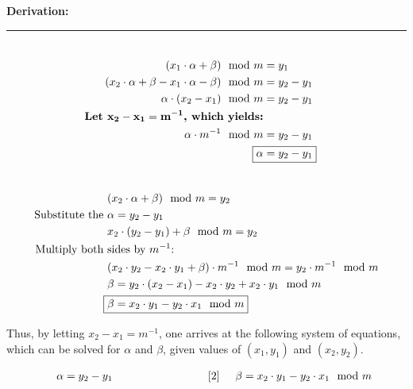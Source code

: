 \documentclass{article}
\begin{document}
\noindent \textbf{Derivation:}
\hrule
\vspace{-.5cm}
\begin{minipage}{.4\textwidth} %
 \begin{align*}
 \\
(x_1 \cdot \alpha + \beta) \mod m &= y_1 \\
(x_2 \cdot \alpha + \beta - x_1 \cdot \alpha - \beta) \mod m &= y_2 - y_1 \\
 \alpha \cdot (x_2 - x_1) \mod m &= y_2 - y_1 \\
\text{\textbf{Let $\mathbf{x_2-x_1 = m^{-1}}$, which yields:}}\\
  \alpha \cdot m^{-1} \mod m &= y_2 - y_1 \\
  \Aboxed{\alpha &= y_2 - y_1}
  \\
  \\
\end{align*}
\end{minipage} %
\hspace{.25cm}
\begin{minipage}{.5\textwidth}
\begin{align*}
&(x_2 \cdot \alpha + \beta) \mod m = y_2 \\
\text{Substitute the }& \text{$\alpha = y_2-y_1$} \\
&x_2 \cdot (y_2 - y_1) + \beta \mod m = y_2 \\
\text{Multiply both } & \text{sides by $m^{-1}$:}  \\
& (x_2 \cdot y_2 - x_2 \cdot y_1 + \beta) \cdot m^{-1} \mod m = y_2 \cdot m^{-1} \mod m \\
& \beta = y_2 \cdot (x_2 - x_1) - x_2 \cdot y_2 + x_2 \cdot y_1 \mod m \\
\Aboxed{& \beta = x_2 \cdot y_1 - y_2 \cdot x_1 \mod m}
\end{align*}
\end{minipage}


Thus, by letting $x_2-x_1 = m^{-1}$, one arrives at the following system of equations, which can be solved for $\alpha$ and $\beta$, given values of $(x_1, y_1)$ and $(x_2, y_2)$.

\vspace{-.5 cm}
\begin{align*}
[1] \hspace{.5cm} \alpha = y_2 - y_1 \hspace{.25\textwidth} [2] \hspace{.5cm}\beta = x_2 \cdot y_1 - y_2 \cdot x_1 \mod m 
\end{align*}
\end{document}
